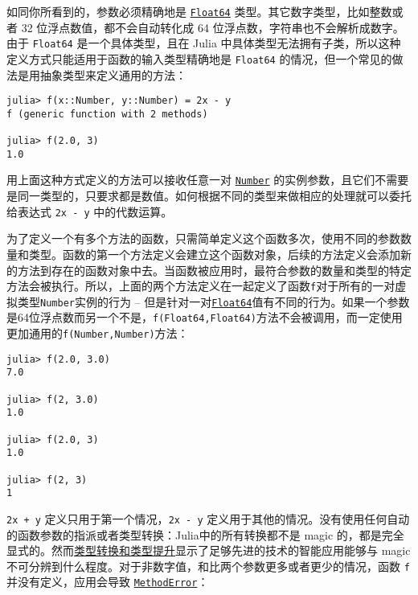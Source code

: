 如同你所看到的，参数必须精确地是 \hyperlink{5027751419500983000}{\texttt{Float64}} 类型。其它数字类型，比如整数或者 32 位浮点数值，都不会自动转化成 64 位浮点数，字符串也不会解析成数字。由于 \texttt{Float64} 是一个具体类型，且在 Julia 中具体类型无法拥有子类，所以这种定义方式只能适用于函数的输入类型精确地是 \texttt{Float64} 的情况，但一个常见的做法是用抽象类型来定义通用的方法：




\begin{verbatim}
julia> f(x::Number, y::Number) = 2x - y
f (generic function with 2 methods)

julia> f(2.0, 3)
1.0
\end{verbatim}



用上面这种方式定义的方法可以接收任意一对 \hyperlink{1990584313715697055}{\texttt{Number}} 的实例参数，且它们不需要是同一类型的，只要求都是数值。如何根据不同的类型来做相应的处理就可以委托给表达式 \texttt{2x - y} 中的代数运算。



为了定义一个有多个方法的函数，只需简单定义这个函数多次，使用不同的参数数量和类型。函数的第一个方法定义会建立这个函数对象，后续的方法定义会添加新的方法到存在的函数对象中去。当函数被应用时，最符合参数的数量和类型的特定方法会被执行。所以，上面的两个方法定义在一起定义了函数\texttt{f}对于所有的一对虚拟类型\texttt{Number}实例的行为 – 但是针对一对\hyperlink{5027751419500983000}{\texttt{Float64}}值有不同的行为。如果一个参数是64位浮点数而另一个不是，\texttt{f(Float64,Float64)}方法不会被调用，而一定使用更加通用的\texttt{f(Number,Number)}方法：




\begin{verbatim}
julia> f(2.0, 3.0)
7.0

julia> f(2, 3.0)
1.0

julia> f(2.0, 3)
1.0

julia> f(2, 3)
1
\end{verbatim}



\texttt{2x + y} 定义只用于第一个情况，\texttt{2x - y} 定义用于其他的情况。没有使用任何自动的函数参数的指派或者类型转换：Julia中的所有转换都不是 magic 的，都是完全显式的。然而\hyperlink{10374023657104680331}{类型转换和类型提升}显示了足够先进的技术的智能应用能够与 magic 不可分辨到什么程度。\footnotemark[2] 对于非数字值，和比两个参数更多或者更少的情况，函数 \texttt{f} 并没有定义，应用会导致 \hyperlink{68769522931907606}{\texttt{MethodError}}：




